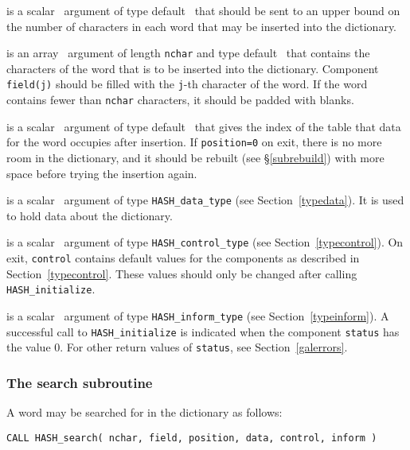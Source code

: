 \documentclass{galahad}
\newcommand{\packagename}{HASH}
\begin{document}
\vspace*{-2mm}
\begin{description}

 is a scalar \intentin\ argument of type default \integer\ that
should be sent to an upper bound on the number of characters in each
word that may be inserted into the dictionary.

 is an array \intentin\ argument of length {\tt nchar} and
type default \character\ that contains the characters of the word that
is to be inserted into the dictionary.
Component {\tt field(j)} should be filled with the {\tt j}-th
character of the word. If the word contains fewer than {\tt nchar} characters,
it should be padded with blanks.

 is a scalar \intentout\ argument of type default \integer\ that
gives the index of the table that data for the word occupies after insertion.
If {\tt position=0} on exit, there is no more room in the dictionary, and
it should be rebuilt (see \S\ref{subrebuild}) with more space before trying
the insertion again.

 is a scalar \intentinout\ argument of type
{\tt \packagename\_data\_type}
(see Section~\ref{typedata}). It is used to hold data about the dictionary.

 is a scalar \intentin\ argument of type
{\tt \packagename\_control\_type}
(see Section~\ref{typecontrol}).
On exit, {\tt control} contains default values for the components as
described in Section~\ref{typecontrol}.
These values should only be changed after calling
{\tt \packagename\_initialize}.

 is a scalar \intentinout\ argument of type
{\tt \packagename\_inform\_type}
(see Section~\ref{typeinform}). A successful call to
{\tt \packagename\_initialize}
is indicated when the  component {\tt status} has the value 0.
For other return values of {\tt status}, see Section~\ref{galerrors}.

\end{description}


\subsubsection{The search subroutine}\label{subsearch}
A word may be searched for in the dictionary as follows:
\vspace*{1mm}

\hspace{8mm}
{\tt CALL \packagename\_search( nchar, field, position, data, control, inform )}
\end{document}
